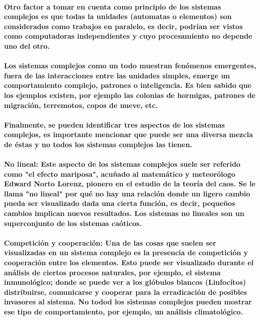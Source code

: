       \paragraph{Otro factor a tomar en cuenta como principio de los sistemas complejos es que todas la unidades (automatas o elementos) son considerados como trabajos en paralelo, es decir, podrían ser vistos como computadoras independientes y cuyo procesamiento no depende uno del otro.}
      \paragraph{Los sistemas complejos como un todo muestran fenómenos emergentes, fuera de las interacciones entre las unidades simples, emerge un comportamiento complejo, patrones o inteligencia. Es bien sabido que los ejemplos existen, por ejemplo las colonias de hormigas, patrones de migración, terremotos, copos de nueve, etc.}
      \paragraph{Finalmente, se pueden identificar tres aspectos de los sistemas complejos, es importante mencionar que puede ser una diversa mezcla de éstas y no todos los sistemas complejos las tienen.}
      \paragraph{\textbf{No lineal}: Este aspecto de los sistemas complejos suele ser referido como "el efecto mariposa", acuñado al matemático y meteorólogo Edward Norto Lorenz, pionero en el estudio de la teoría del caos. Se le llama "no lineal" por qué no hay una relación donde un ligero cambio pueda ser visualizado dada una cierta función, es decir, pequeños cambios implican nuevos resultados. Los sistemas no lineales son un superconjunto de los sistemas caóticos.}
      \paragraph{\textbf{Competición y cooperación}: Una de las cosas que suelen ser visualizadas en un sistema complejo es la presencia de competición y cooperación entre los elementos. Esto puede ser visualizado durante el análisis de ciertos procesos naturales, por ejemplo, el sistema inmunológico; donde se puede ver a los glóbulos blancos (Linfocítos) distribuirse, comunicarse y cooperar para la erradicación de posibles invasores al sistema. No todod los sistemas complejos pueden mostrar ese tipo de comportamiento, por ejemplo, un análisis climatológico.}
